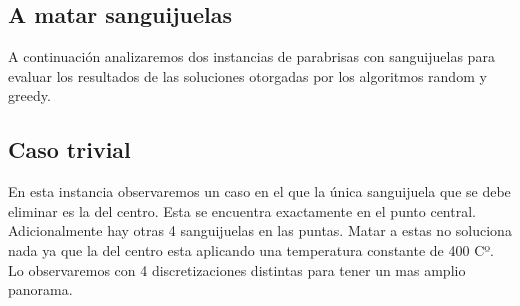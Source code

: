 \subsection{A matar sanguijuelas}
A continuación analizaremos dos instancias de parabrisas con sanguijuelas para evaluar los resultados de las soluciones otorgadas por los algoritmos random y greedy. 
\subsection{Caso trivial}

En esta instancia observaremos un caso en el que la única sanguijuela que se debe eliminar es la del centro. Esta se encuentra exactamente en el punto central. Adicionalmente hay otras 4 sanguijuelas en las puntas. 
Matar a estas no soluciona nada ya que la del centro esta aplicando una temperatura constante de 400 Cº. Lo observaremos con 4 discretizaciones distintas para tener un mas amplio panorama.

